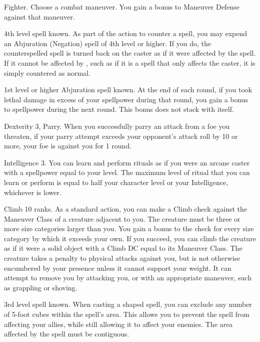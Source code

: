 \featpre Fighter.
\featben Choose a combat maneuver.
You gain a  bonus to Maneuver Defense against that maneuver.

\featpre 4th level spell known.
\featben As part of the action to counter a spell, you may expend an Abjuration (Negation) spell of 4th level or higher.
If you do, the counterspelled spell is turned back on the caster as if it were affected by the 
spell.
If it cannot be affected by , such as if it is a spell that only affects the caster, it is simply countered as normal.

\featpre 1st level or higher Abjuration spell known.
\featben At the end of each round, if you took lethal damage in excess of your spellpower during that round, you gain a  bonus to spellpower during the next round.
This bonus does not stack with itself.

\featpres Dexterity 3, Parry.
\featben When you successfully parry an attack from a foe you threaten, if your parry attempt exceeds your opponent's attack roll by 10 or more, your foe is  against you for 1 round.

\featpre Intelligence 3.
\featben You can learn and perform rituals as if you were an arcane caster with a spellpower equal to your level.
The maximum level of ritual that you can learn or perform is equal to half your character level or your Intelligence, whichever is lower.

\featpre Climb 10 ranks.
\featben As a standard action, you can make a Climb check against the Maneuver Class of a creature adjacent to you.
The creature must be three or more size categories larger than you.
You gain a  bonus to the check for every size category by which it exceeds your own.
If you succeed, you can climb the creature as if it were a solid object with a Climb DC equal to its Maneuver Class.
The creature takes a  penalty to physical attacks against you, but is not otherwise encumbered by your presence unless it cannot support your weight.
It can attempt to remove you by attacking you, or with an appropriate maneuver, such as grappling or shoving.

\featpre 3rd level spell known.
\featben When casting a shaped spell, you can exclude any number of 5-foot cubes within the spell's area.
This allows you to prevent the spell from affecting your allies, while still allowing it to affect your enemies.
The area affected by the spell must be contiguous.

